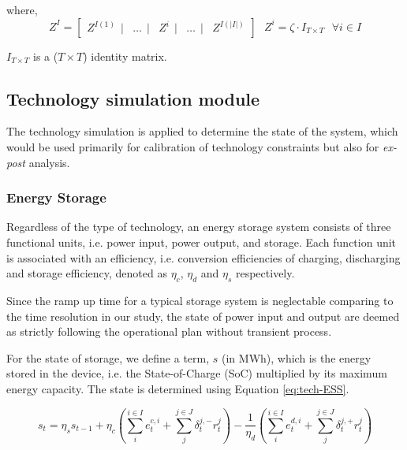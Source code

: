 where,
\begin{equation*}
Z^I = \begin{bmatrix}
Z^{I(1)}~~|&\dots~~|&Z^i~~|&\dots~~|&Z^{I(|I|)}
\end{bmatrix}~~~
Z^i = \zeta \cdot I_{T\times T} ~~~ \forall i \in I
\end{equation*}

$I_{T \times T}$ is a ($T \times T$) identity matrix. 

\subsection{Technology simulation module}
\label{sec:tech-simulation-module}
The technology simulation is applied to determine the state of the system, which would be used primarily for calibration of technology constraints but also for \textit{ex-post} analysis.

\subsubsection{Energy Storage}
Regardless of the type of technology, an energy storage system consists of three functional units, i.e. power input, power output, and storage. Each function unit is associated with an efficiency, i.e. conversion efficiencies of charging, discharging and storage efficiency, denoted as $\eta_c$, $\eta_d$ and $\eta_s$ respectively.

Since the ramp up time for a typical storage system is neglectable comparing to the time resolution in our study, the state of power input and output are deemed as strictly following the operational plan without transient process.

For the state of storage, we define a term, $s$ (in MWh), which is the energy stored in the device, i.e. the State-of-Charge (SoC) multiplied by its maximum energy capacity. The state is determined using Equation \ref{eq:tech-ESS}.

\begin{equation}
\label{eq:tech-ESS}
s_t = \eta_s s_{t-1} + \eta_c (\sum_{i}^{i \in I} e_t^{c,i} + \sum_{j}^{j \in J}\delta_t^{j,-}r_t^j)- \frac{1}{\eta_d} (\sum_{i}^{i \in I} e_t^{d,i} + \sum_{j}^{j \in J}\delta_t^{j,+}r_t^j)
\end{equation} 

